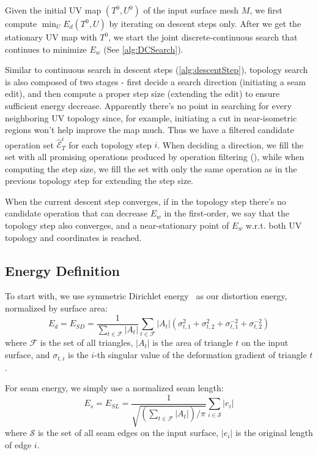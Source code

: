 Given the initial UV map $(T^0, U^0)$ of the input surface mesh $M$, we first compute $\min_U E_d(T^0,U)$ by iterating on descent steps only. After we get the stationary UV map with $T^0$, we start the joint discrete-continuous search that continues to minimize $E_w$ (See \autoref{alg:DCSearch}). 

Similar to continuous search in descent steps (\autoref{alg:descentStep}), topology search is also composed of two stages - first decide a search direction (initiating a seam edit), and then compute a proper step size (extending the edit) to ensure sufficient energy decrease. Apparently there's no point in searching for every neighboring UV topology since, for example, initiating a cut in near-isometric regions won't help improve the map much. Thus we have a filtered candidate operation set $\hat{\mathcal{E}}^i_T$ for each topology step $i$. When deciding a direction, we fill the set with all promising operations produced by operation filtering (), while when computing the step size, we fill the set with only the same operation as in the previous topology step for extending the step size.

When the current descent step converges, if in the topology step there's no candidate operation that can decrease $E_w$ in the first-order, we say that the topology step also converges, and a near-stationary point of $E_w$ w.r.t. both UV topology and coordinates is reached. 

\subsection{Energy Definition}

To start with, we use symmetric Dirichlet energy~\cite{Smith2015Bijective} as our distortion energy, normalized by surface area:
\[ E_d = E_{SD} = \frac{1}{\sum_{t\in\mathcal{F}} |A_t|} \sum_{t\in\mathcal{F}} |A_t|(\sigma_{t,1}^2 + \sigma_{t,2}^2 + \sigma_{t,1}^{-2} + \sigma_{t,2}^{-2}) \]
where $\mathcal{F}$ is the set of all triangles, $|A_t|$ is the area of triangle $t$ on the input surface, and $\sigma_{t,i}$ is the $i$-th singular value of the deformation gradient of triangle $t$.

For seam energy, we simply use a normalized seam length:
\[ E_s = E_{SL} = \frac{1}{\sqrt{(\sum_{t\in\mathcal{F}} |A_t|)/\pi}} \sum_{i \in \mathcal{S}} |e_i| \]
where $\mathcal{S}$ is the set of all seam edges on the input surface, $|e_i|$ is the original length of edge $i$.

